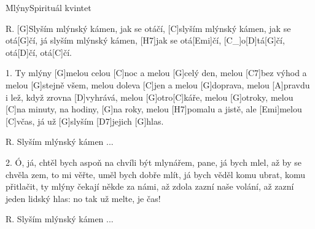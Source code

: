 \begin{song}{Mlýny}{Spirituál kvintet}

\begin{xverse}{R. }
[G]Slyším mlýnský kámen, jak se otáčí,
[C]slyším mlýnský kámen, jak se otá[G]{čí},
já slyším mlýnský kámen, [H7]jak se otá[Emi]{čí},
[C_]o[D]tá[G]{čí}, otá[D]{čí}, otá[C]{čí}.
\end{xverse}

\begin{xverse}{1. }
Ty mlýny [G]melou celou [C]noc a melou [G]celý den,
melou [C7]bez výhod a melou [G]stejně všem,
melou doleva [C]jen a melou [G]doprava,
melou [A]pravdu i lež, když zrovna [D]vyhrává,
melou [G]otro[C]káře, melou [G]otroky,
melou [C]na minuty, na hodiny, [G]na roky,
melou [H7]pomalu a jistě, ale [Emi]melou [C]včas,
já už [G]slyším [D7]jejich [G]hlas.
\end{xverse}

\begin{xverse}{R. }
Slyším mlýnský kámen ...
\end{xverse}

\begin{xverse}{2. }
Ó, já, chtěl bych aspoň na chvíli být mlynářem,
pane, já bych mlel, až by se chvěla zem,
to mi věřte, uměl bych dobře mlít,
já bych věděl komu ubrat, komu přitlačit,
ty mlýny čekají někde za námi, až zdola zazní naše volání,
až zazní jeden lidský hlas: no tak už melte, je čas!
\end{xverse}

\begin{xverse}{R. }
Slyším mlýnský kámen ...
\end{xverse}

\end{song}

